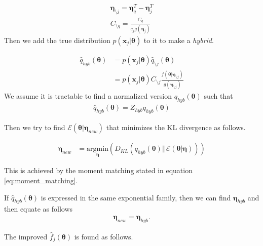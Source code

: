 \documentclass[a4]{article}
\begin{document}
\begin{equation}
\begin{aligned}
\bm{\eta}_{\setminus j} = \bm{\eta}_q^T - \bm{\eta}_j^T\\
C_{\setminus q} = \frac{C_q}{c_j g(\bm{\eta}_j)}
\end{aligned}
\end{equation}
Then we add the true distribution $p(\bm{x}_j|\bm{\theta})$ to it to make a \emph{hybrid}.

\begin{equation}
\begin{aligned}
\hat{q}_{hyb}(\bm{\theta})
&= p(\bm{x}_j|\bm{\theta})\hat{q}_{\setminus j}(\bm{\theta})\\
&=
p(\bm{x}_j|\bm{\theta})C_{\setminus j}\frac{f(\bm{\theta}|\bm{\eta}_{\setminus j})}{g(\bm{\eta}_{\setminus j})}
\end{aligned}
\end{equation}
We assume it is tractable to find a normalized version $q_{hyb}(\bm{\theta})$ such that
\begin{equation}
\begin{aligned}
\hat{q}_{hyb}(\bm{\theta}) = Z_{hyb}q_{hyb}(\bm{\theta})\label{eq:hybrid}
\end{aligned}
\end{equation}

Then we try to find $\mathcal{E}(\bm{\theta}|\bm{\eta}_{new})$ that minimizes the KL divergence as follows.

\begin{equation}
\begin{aligned}
\bm{\eta}_{new} &= \underset{\bm{\eta}}{\mathrm{argmin}}\left(
D_{KL}(
    q_{hyb}(\bm{\theta})
||
    \mathcal{E}(\bm{\theta}|\bm{\eta})
)
\right)
\end{aligned}
\end{equation}

This is achieved by the moment matching stated in equation \ref{eq:moment_matching}.

If $\hat{q}_{hyb}(\bm{\theta})$ is expressed in the same exponential family, then we can find
$\bm{\eta}_{hyb}$ and then equate as follows
\begin{equation}
\begin{aligned}
\bm{\eta}_{new} = \bm{\eta}_{hyb}\text{.}
\end{aligned}
\end{equation}

The improved $\hat{f}_j(\bm{\theta})$ is found as follows.
\end{document}
